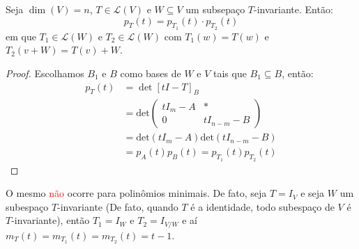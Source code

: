 \documentclass[11pt,twoside,a4paper]{book}
\begin{document}
\begin{lema}
Seja $\dim(V)=n$, $T\in\mathcal{L}(V)$ e $W\subseteq V$ um subsepaço $T$-invariante. Então:
\[
p_T(t)=p_{T_1}(t)\cdot p_{T_2}(t)
\]
em que $T_1\in\mathcal{L}(W)$ e $T_2\in\mathcal{L}(W)$ com $T_1(w)=T(w)$ e $T_2(v+W)=T(v)+W$.
\end{lema}
\begin{proof}
Escolhamos $B_1$ e $B$ como bases de $W$ e $V$ tais que $B_1\subseteq B$, então:
\begin{align*}
  p_T(t)&=\det[tI-T]_B\\
        &=\text{det}\begin{pmatrix}
          tI_m-A & * \\ 0 & tI_{n-m}-B\end{pmatrix}\\
        &=\text{det}(tI_m-A)\text{det}(tI_{n-m}-B)\\
        &=p_A(t)p_B(t)=p_{T_1}(t)p_{T_2}(t)
\end{align*}
\end{proof}

\begin{observacao}
O mesmo \textcolor{red}{não} ocorre para polinômios minimais. De fato, seja $T=I_V$ e seja $W$ um subespaço $T$-invariante (De fato, quando \(T\) é a identidade, todo subespaço de \(V\) é \(T\)-invariante), então $T_1=I_W$ e $T_2=I_{V/W}$ e aí $m_T(t)=m_{T_1}(t)=m_{T_2}(t)=t-1$.
\end{observacao}
\end{document}

